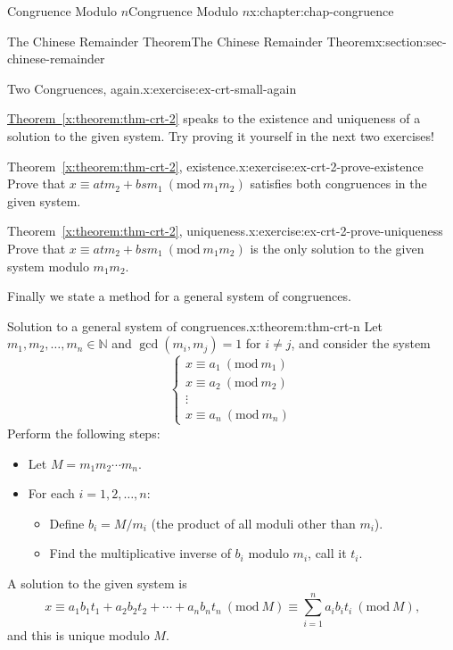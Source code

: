 \documentclass[oneside,10pt,]{book}
\newcommand{\xreffont}{\relax}
\numberwithin{equation}{section}
\newcommand{\Mod}[1]{\ \left(\mathrm{mod}\ #1\right)}
\begin{document}
\begin{chapterptx}{Congruence Modulo \(n\)}{}{Congruence Modulo \(n\)}{}{}{x:chapter:chap-congruence}
\begin{sectionptx}{The Chinese Remainder Theorem}{}{The Chinese Remainder Theorem}{}{}{x:section:sec-chinese-remainder}
\begin{inlineexercise}{Two Congruences, again.}{x:exercise:ex-crt-small-again}
\end{inlineexercise}
\hyperref[x:theorem:thm-crt-2]{Theorem~{\xreffont\ref{x:theorem:thm-crt-2}}} speaks to the existence and uniqueness of a solution to the given system. Try proving it yourself in the next two exercises!%
\begin{inlineexercise}{Theorem~{\xreffont\ref*{x:theorem:thm-crt-2}}, existence.}{x:exercise:ex-crt-2-prove-existence}%
Prove that \(x \equiv atm_2 + bsm_1 \Mod{m_1m_2}\) satisfies both congruences in the given system.%
\end{inlineexercise}
\begin{inlineexercise}{Theorem~{\xreffont\ref*{x:theorem:thm-crt-2}}, uniqueness.}{x:exercise:ex-crt-2-prove-uniqueness}%
Prove that \(x \equiv atm_2 + bsm_1 \Mod{m_1m_2}\) is the only solution to the given system modulo \(m_1m_2\).%
\end{inlineexercise}
Finally we state a method for a general system of congruences.%
\begin{theorem}{Solution to a general system of congruences.}{}{x:theorem:thm-crt-n}%
Let \(m_1,m_2,\ldots,m_n \in \mathbb{N}\) and \(\gcd(m_i,m_j) = 1\) for \(i \ne j\), and consider the system%
\begin{equation*}
\begin{cases} x \equiv a_1 \Mod{m_1} \\ x \equiv a_2 \Mod{m_2} \\ \vdots \\ x \equiv a_n \Mod{m_n} \end{cases}
\end{equation*}
Perform the following steps:%
\begin{itemize}[label=\textbullet]
\item{}Let \(M = m_1m_2\cdots m_n\).%
\item{}For each \(i = 1,2,\ldots,n\):%
\begin{itemize}[label=$\circ$]
\item{}Define \(b_i = M/m_i\) (the product of all moduli other than \(m_i\)).%
\item{}Find the multiplicative inverse of \(b_i\) modulo \(m_i\), call it \(t_i\).%
\end{itemize}
%
\end{itemize}
A solution to the given system is%
\begin{equation*}
x \equiv a_1b_1t_1 + a_2b_2t_2 + \cdots + a_nb_nt_n \Mod{M}\equiv \sum_{i=1}^n a_ib_it_i \Mod{M}\text{,}
\end{equation*}
and this is unique modulo \(M\).%

\end{theorem}
\end{sectionptx}
\end{chapterptx}
\end{document}
